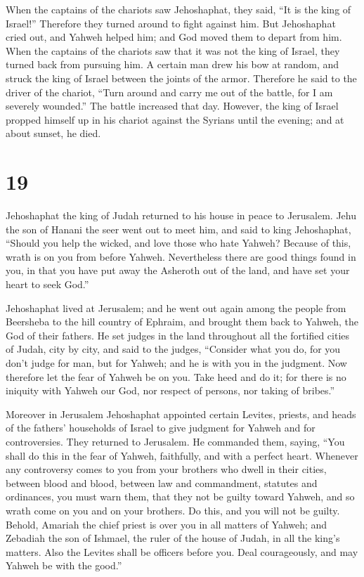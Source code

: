  When the captains of the chariots saw Jehoshaphat, they
said, ``It is the king of Israel!'' Therefore they turned around to
fight against him. But Jehoshaphat cried out, and Yahweh helped him; and
God moved them to depart from him.  When the captains of
the chariots saw that it was not the king of Israel, they turned back
from pursuing him.  A certain man drew his bow at random,
and struck the king of Israel between the joints of the armor. Therefore
he said to the driver of the chariot, ``Turn around and carry me out of
the battle, for I am severely wounded.''  The battle
increased that day. However, the king of Israel propped himself up in
his chariot against the Syrians until the evening; and at about sunset,
he died.

\hypertarget{section-18}{%
\section{19}\label{section-18}}

 Jehoshaphat the king of Judah returned to his house in
peace to Jerusalem.  Jehu the son of Hanani the seer went
out to meet him, and said to king Jehoshaphat, ``Should you help the
wicked, and love those who hate Yahweh? Because of this, wrath is on you
from before Yahweh.  Nevertheless there are good things
found in you, in that you have put away the Asheroth out of the land,
and have set your heart to seek God.''

 Jehoshaphat lived at Jerusalem; and he went out again among
the people from Beersheba to the hill country of Ephraim, and brought
them back to Yahweh, the God of their fathers.  He set
judges in the land throughout all the fortified cities of Judah, city by
city,  and said to the judges, ``Consider what you do, for
you don't judge for man, but for Yahweh; and he is with you in the
judgment.  Now therefore let the fear of Yahweh be on you.
Take heed and do it; for there is no iniquity with Yahweh our God, nor
respect of persons, nor taking of bribes.''

 Moreover in Jerusalem Jehoshaphat appointed certain
Levites, priests, and heads of the fathers' households of Israel to give
judgment for Yahweh and for controversies. They returned to Jerusalem.
 He commanded them, saying, ``You shall do this in the fear
of Yahweh, faithfully, and with a perfect heart.  Whenever
any controversy comes to you from your brothers who dwell in their
cities, between blood and blood, between law and commandment, statutes
and ordinances, you must warn them, that they not be guilty toward
Yahweh, and so wrath come on you and on your brothers. Do this, and you
will not be guilty.  Behold, Amariah the chief priest is
over you in all matters of Yahweh; and Zebadiah the son of Ishmael, the
ruler of the house of Judah, in all the king's matters. Also the Levites
shall be officers before you. Deal courageously, and may Yahweh be with
the good.''

